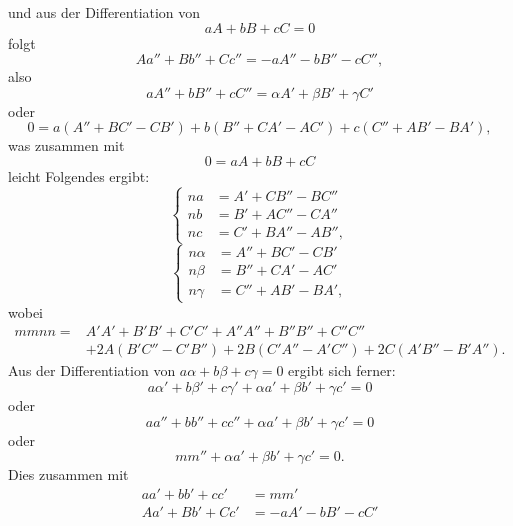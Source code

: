 %
\noindent und aus der Differentiation von
\[
aA+bB+cC=0
\]
folgt
\[
Aa''+Bb''+Cc''=-aA''-bB''-cC'',
\]
also
\[
aA''+bB''+cC''=\alpha A'+\beta B'+\gamma C'
\]
oder
\[
0=a(A''+BC'-CB')+b(B''+CA'-AC')+c(C''+AB'-BA'),
\]
was zusammen mit
\[
0=aA+bB+cC
\]
leicht Folgendes ergibt:
\begin{equation}\tag*{[12]}
\left\{\begin{aligned}
na&=A'+CB''-BC''\\
nb&=B'+AC''-CA''\\
nc&=C'+BA''-AB'',
\end{aligned}\right.
\end{equation}
\begin{equation}\tag*{[13]}
\left\{\begin{aligned}
n\alpha&=A''+BC'-CB'\\
n\beta&=B''+CA'-AC'\\
n\gamma&=C''+AB'-BA',
\end{aligned}\right.
\end{equation}
wobei
{\small
\begin{equation}\tag*{[14]}
\begin{aligned}
mmnn={}&A'A'+B'B'+C'C'+A''A''+B''B''+C''C''\\
&+2A(B'C''-C'B'')+2B(C'A''-A'C'')+2C(A'B''-B'A'').
\end{aligned}
\end{equation}
}
\indent Aus der Differentiation von $a\alpha+b\beta+c\gamma=0$ ergibt sich ferner:
\[
a\alpha'+b\beta'+c\gamma'+\alpha a'+\beta b'+\gamma c'=0
\]
oder
\[
aa''+bb''+cc''+\alpha a'+\beta b'+\gamma c'=0
\]
oder
\[
mm''+\alpha a'+\beta b'+\gamma c'=0.
\]
Dies zusammen mit
\[
\begin{aligned}
aa'+bb'+cc'&=mm'\\
Aa'+Bb'+Cc'&=-aA'-bB'-cC'
\end{aligned}
\]
